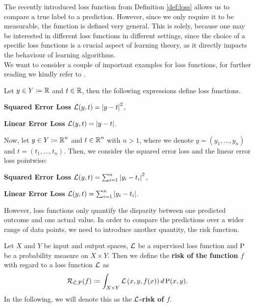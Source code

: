 The recently introduced loss function from Definition \ref{def:loss} allows us to compare a true label to a prediction. However, since we only require it to be measurable, the function is defined very general. This is solely, because one may be interested in different loss functions in different settings, since the choice of a specific loss functions is a crucial aspect of learning theory, as it directly impacts the behaviour of learning algorithms.\\
We want to consider a couple of important examples for loss functions, for further reading we kindly refer to \cite[Chapter~4.3]{goodfellow2016deep}.


\begin{example}\label{ex:supervised_loss}
Let $y\in Y\coloneqq \operatorname{\mathbb{R}}$ and $t\in \operatorname{\mathbb{R}}$, then the following expressions define loss functions.
\begin{mydescription}{}
\item[\textbf{Squared Error Loss}] $\operatorname{\mathcal{L}}(y, t) = \left|y - t\right|^2$,
\item[\textbf{Linear Error Loss}]  $\operatorname{\mathcal{L}}(y, t) = \left|y - t\right|$.
\end{mydescription}
Now, let $y\in Y \coloneqq \operatorname{\mathbb{R}}^n$ and $t\in\operatorname{\mathbb{R}}^n$ with $n>1$, where we denote $y = (y_1,\ldots, y_n)$ and $t = (t_1,\ldots, t_n)$. Then, we consider the squared error loss and the linear error loss pointwise:
\begin{mydescription}{}
\item[\textbf{Squared Error Loss}] $\operatorname{\mathcal{L}}(y, t) = \sum_{i=1}^n\left|y_i - t_i\right|^2$,
\item[\textbf{Linear Error Loss}]  $\operatorname{\mathcal{L}}(y, t) = \sum_{i=1}^n\left|y_i - t_i\right|$.
\end{mydescription}
\end{example}


However, loss functions only quantify the disparity between one predicted outcome and one actual value. In order to compare the predictions over a wider range of data points, we need to introduce another quantity, the risk function.


\begin{definition}\label{def:risk}
Let $X$ and $Y$ be input and output spaces, $\operatorname{\mathcal{L}}$ be a supervised loss function and $\operatorname{\text{P}}$ be a probability measure on $X \times Y$. Then we define the \textbf{risk of the function $f$} with regard to a loss function $\operatorname{\mathcal{L}}$ as
\begin{align*}
\operatorname{\mathcal{R}}_{\operatorname{\mathcal{L}}, \operatorname{\text{P}}}(f) \coloneqq \int_{X\times Y} \operatorname{\mathcal{L}}\left(x, y, f(x) \right) d \operatorname{\text{P}}(x, y).
\end{align*}
In the following, we will denote this as the \textbf{$\operatorname{\mathcal{L}}$-risk of $f$}.
\end{definition}


